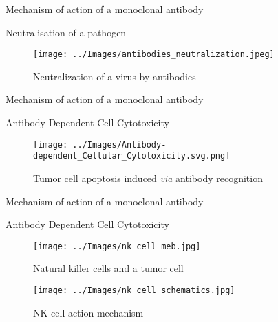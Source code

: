 \begin{frame}{Mechanism of action of a monoclonal antibody}
    \begin{block}{Neutralisation of a pathogen}
        \begin{figure}
            \centering
            \texttt{[image: ../Images/antibodies\_neutralization.jpeg]}
            \caption{Neutralization of a virus by antibodies}
            \label{fig:neutralization_antibodies}
        \end{figure}
    \end{block}
\end{frame}

\begin{frame}{Mechanism of action of a monoclonal antibody}
    \begin{block}{Antibody Dependent Cell Cytotoxicity}
        \begin{figure}
            \centering
            \texttt{[image: ../Images/Antibody-dependent\_Cellular\_Cytotoxicity.svg.png]}
            \caption{Tumor cell apoptosis induced \emph{via} antibody recognition}
            \label{fig:ADCC}
        \end{figure}
    \end{block}
\end{frame}

\begin{frame}{Mechanism of action of a monoclonal antibody}
    \begin{block}{Antibody Dependent Cell Cytotoxicity}
        \vspace{1em}
        \begin{minipage}{0.395\textwidth}
            \begin{figure}
                \centering
                \texttt{[image: ../Images/nk\_cell\_meb.jpg]}
                \caption{Natural killer cells and a tumor cell}
            \end{figure}  
        \end{minipage}\hfill
        \begin{minipage}{0.6\textwidth}
            \begin{figure}
                \centering
                \texttt{[image: ../Images/nk\_cell\_schematics.jpg]}
                \caption{NK cell action mechanism}
            \end{figure}    
        \end{minipage}
    \end{block}
\end{frame}